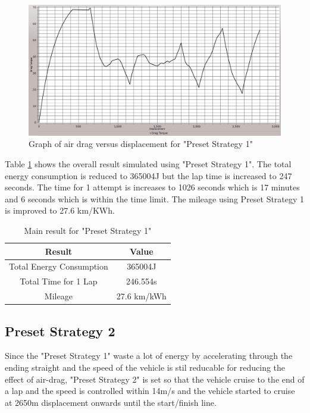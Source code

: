 \begin{figure}[htb]
	\centering
	\includegraphics[width=6in]{images/1_3.jpg}
	\caption{Graph of air drag versus displacement for "Preset Strategy 1"}
	\label{im:1_3}
\end{figure}

Table \ref{tb:preset1Result} shows the overall result simulated using "Preset Strategy 1". The total energy consumption is reduced to 365004J but the lap time is increased to 247 seconds. The time for 1 attempt is increases to 1026 seconds which is 17 minutes and 6 seconds which is within the time limit. The mileage using Preset Strategy 1 is improved to 27.6 km/KWh.

\begin{table}[htbp]
\begin{center}
\begin{tabular}{|c|c|}
\hline
\textbf{Result} & \textbf{Value} \\ \hline
Total Energy Consumption & 365004J \\ \hline
Total Time for 1 Lap & 246.554s \\ \hline
Mileage & 27.6 km/kWh \\ \hline
\end{tabular}
\end{center}
\caption{Main result for "Preset Strategy 1" }
\label{tb:preset1Result}
\end{table} \clearpage

\subsection{Preset Strategy 2}
Since the "Preset Strategy 1" waste a lot of energy by accelerating through the ending straight and the speed of the vehicle is stil reducable for reducing the effect of air-drag, "Preset Strategy 2" is set so that the vehicle cruise to the end of a lap and the speed is controlled within 14m/s and the vehicle started to cruise at 2650m displacement onwards until the start/finish line.

